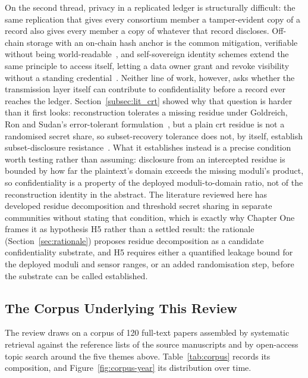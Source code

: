 \documentclass[12pt,a4paper,oneside]{book}
\begin{document}
On the second thread, privacy in a replicated ledger is structurally
difficult: the same replication that gives every consortium member a
tamper-evident copy of a record also gives every member a copy of whatever
that record discloses. Off-chain storage with an on-chain hash anchor is
the common mitigation, verifiable without being
world-readable~\cite{kim2023privacy}, and self-sovereign identity schemes
extend the same principle to access itself, letting a data owner grant and
revoke visibility without a standing
credential~\cite{amraouy2025ssi}. Neither line of work, however, asks
whether the transmission layer itself can contribute to confidentiality
before a record ever reaches the ledger. Section~\ref{subsec:lit_crt}
showed why that question is harder than it first looks: reconstruction
tolerates a missing residue under Goldreich, Ron and Sudan's
error-tolerant formulation~\cite{goldreich1999china}, but a plain
\gls{crt} residue is not a randomised secret share, so subset-recovery
tolerance does not, by itself, establish subset-disclosure
resistance~\cite{shoup2009computational}. What it establishes instead is
a precise condition worth testing rather than assuming: disclosure from
an intercepted residue is bounded by how far the plaintext's domain
exceeds the missing moduli's product, so confidentiality is a property of
the deployed moduli-to-domain ratio, not of the reconstruction identity
in the abstract. The literature reviewed here has developed residue
decomposition and threshold secret sharing in separate communities
without stating that condition, which is exactly why Chapter One frames
it as hypothesis H5 rather than a settled result: the rationale
(Section~\ref{sec:rationale}) proposes residue decomposition as a
candidate confidentiality substrate, and H5 requires either a quantified
leakage bound for the deployed moduli and sensor ranges, or an added
randomisation step, before the substrate can be called established.

\subsection{The Corpus Underlying This Review}
\label{subsec:lit_corpus}

The review draws on a corpus of 120 full-text papers assembled by systematic
retrieval against the reference lists of the source manuscripts and by
open-access topic search around the five themes above. Table~\ref{tab:corpus}
records its composition, and Figure~\ref{fig:corpus-year} its distribution over
time.
\end{document}
